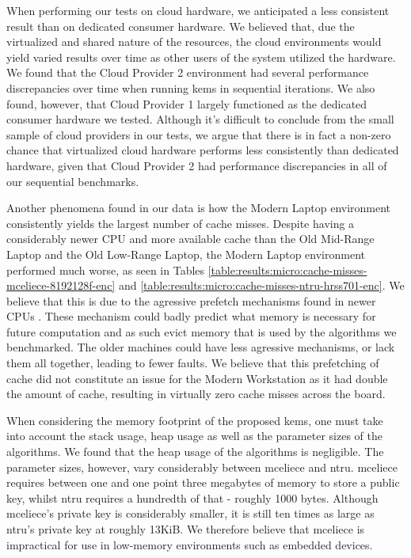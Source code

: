 When performing our tests on cloud hardware, we anticipated a less consistent result than on dedicated consumer hardware. We believed that, due the virtualized and shared nature of the resources, the cloud environments would yield varied results over time as other users of the system utilized the hardware. We found that the Cloud Provider 2 environment had several performance discrepancies over time when running \glspl{kem} in sequential iterations. We also found, however, that Cloud Provider 1 largely functioned as the dedicated consumer hardware we tested. Although it's difficult to conclude from the small sample of cloud providers in our tests, we argue that there is in fact a non-zero chance that virtualized cloud hardware performs less consistently than dedicated hardware, given that Cloud Provider 2 had performance discrepancies in all of our sequential benchmarks. 

Another phenomena found in our data is how the Modern Laptop environment consistently yields the largest number of cache misses. Despite having a considerably newer CPU and more available cache than the Old Mid-Range Laptop and the Old Low-Range Laptop, the Modern Laptop environment performed much worse, as seen in Tables \ref{table:results:micro:cache-misses-mceliece-8192128f-enc} and \ref{table:results:micro:cache-misses-ntru-hrss701-enc}. We believe that this is due to the agressive prefetch mechanisms found in newer CPUs . These mechanism could badly predict what memory is necessary for future computation and as such evict memory that is used by the algorithms we benchmarked. The older machines could have less agressive mechanisms, or lack them all together, leading to fewer faults. We believe that this prefetching of cache did not constitute an issue for the Modern Workstation as it had double the amount of cache, resulting in virtually zero cache misses across the board.

When considering the memory footprint of the proposed \glspl{kem}, one must take into account the stack usage, heap usage as well as the parameter sizes of the algorithms. We found that the heap usage of the algorithms is negligible. The parameter sizes, however, vary considerably between \gls{mceliece} and \gls{ntru}. \gls{mceliece} requires between one and one point three megabytes of memory to store a public key, whilst \gls{ntru} requires a hundredth of that - roughly 1000 bytes. Although \gls{mceliece}'s private key is considerably smaller, it is still ten times as large as \gls{ntru}'s private key at roughly 13KiB. We therefore believe that \gls{mceliece} is impractical for use in low-memory environments such as embedded devices.

